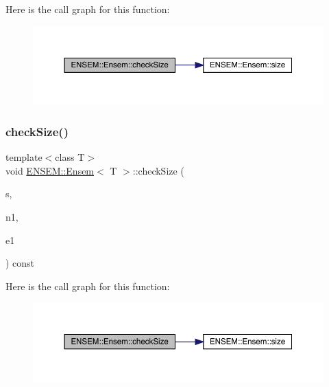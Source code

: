 Here is the call graph for this function\+:
\nopagebreak
\begin{figure}[H]
\begin{center}
\leavevmode
\includegraphics[width=350pt]{d7/d3e/classENSEM_1_1Ensem_a32978c0e251d9731bdb83c6069eb059d_cgraph}
\end{center}
\end{figure}
\mbox{\label{classENSEM_1_1Ensem_a4c06fadea7b637572de2347739b78004}} 
\subsubsection{\texorpdfstring{checkSize()}{checkSize()}\hspace{0.1cm}{\footnotesize\ttfamily [4/6]}}
{\footnotesize\ttfamily template$<$class T$>$ \\
void \mbox{\hyperlink{classENSEM_1_1Ensem}{E\+N\+S\+E\+M\+::\+Ensem}}$<$ T $>$\+::check\+Size (\begin{DoxyParamCaption}\item[{const char $\ast$}]{s,  }\item[{int}]{n1,  }\item[{\mbox{\hyperlink{namespaceENSEM_a2dc2c4a26884f343471e52f23479ddbe}{Ensem\+Type\+\_\+t}}}]{e1 }\end{DoxyParamCaption}) const\hspace{0.3cm}{\ttfamily [inline]}}

Here is the call graph for this function\+:
\nopagebreak
\begin{figure}[H]
\begin{center}
\leavevmode
\includegraphics[width=350pt]{d7/d3e/classENSEM_1_1Ensem_a4c06fadea7b637572de2347739b78004_cgraph}
\end{center}
\end{figure}
\mbox{\label{classENSEM_1_1Ensem_a4c06fadea7b637572de2347739b78004}} 
